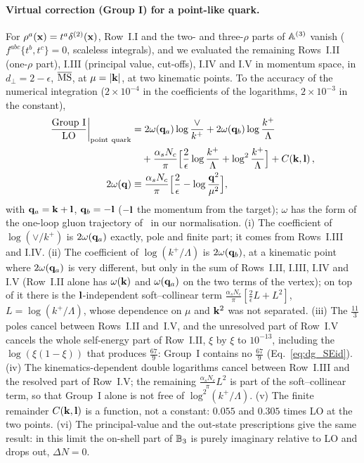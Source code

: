 \paragraph{Virtual correction (Group I) for a point-like quark.} For $\rho^a(\mathbf{x})=t^a\delta^{(2)}(\mathbf{x})$, Row~I.I and the two- and three-$\rho$ parts of $\mathbb{A}^{(3)}$ vanish ($f^{abc}\{t^b,t^c\}=0$, scaleless integrals), and we evaluated the remaining Rows~I.II (one-$\rho$ part), I.III (principal value, cut-offs), I.IV and I.V in momentum space, in $d_\perp=2-\epsilon$, $\overline{\rm MS}$, at $\mu=|\mathbf{k}|$, at two kinematic points. To the accuracy of the numerical integration ($2\times10^{-4}$ in the coefficients of the logarithms, $2\times10^{-3}$ in the constant),
\begin{align}\label{eq:dilute_groupI}
\frac{\text{Group I}}{\rm LO}\bigg|_{\rm point\ quark}&=2\omega(\mathbf{q}_a)\log\frac{\vee}{k^+}+2\omega(\mathbf{q}_b)\log\frac{k^+}{\Lambda}\notag\\&\quad+\frac{\alpha_sN_c}{\pi}\Big[\frac2\epsilon\log\frac{k^+}{\Lambda}+\log^2\frac{k^+}{\Lambda}\Big]+C(\mathbf{k},\mathbf{l})\,,\notag\\
2\omega(\mathbf{q})&\equiv\frac{\alpha_sN_c}{\pi}\Big[\frac2\epsilon-\log\frac{\mathbf{q}^2}{\mu^2}\Big],
\end{align}
with $\mathbf{q}_a=\mathbf{k}+\mathbf{l}$, $\mathbf{q}_b=-\mathbf{l}$ ($-\mathbf{l}$ the momentum from the target); $\omega$ has the form of the one-loop gluon trajectory of~\cite{Fadin:1998py} in our normalisation. (i) The coefficient of $\log(\vee/k^+)$ is $2\omega(\mathbf{q}_a)$ exactly, pole and finite part; it comes from Rows~I.III and I.IV. (ii) The coefficient of $\log(k^+/\Lambda)$ is $2\omega(\mathbf{q}_b)$, at a kinematic point where $2\omega(\mathbf{q}_a)$ is very different, but only in the sum of Rows~I.II, I.III, I.IV and I.V (Row~I.II alone has $\omega(\mathbf{k})$ and $\omega(\mathbf{q}_a)$ on the two terms of the vertex); on top of it there is the $\mathbf{l}$-independent soft--collinear term $\frac{\alpha_sN_c}{\pi}[\frac2\epsilon L+L^2]$, $L=\log(k^+/\Lambda)$, whose dependence on $\mu$ and $\mathbf{k}^2$ was not separated. (iii) The $\frac{11}{3}$ poles cancel between Rows~I.II and~I.V, and the unresolved part of Row~I.V cancels the whole self-energy part of Row~I.II, $\xi$ by $\xi$ to $10^{-13}$, including the $\log(\xi(1-\xi))$ that produces $\frac{67}{9}$: Group~I contains no $\frac{67}{9}$ (Eq.~\eqref{eq:dg_SEid}). (iv) The kinematics-dependent double logarithms cancel between Row~I.III and the resolved part of Row~I.V; the remaining $\frac{\alpha_sN_c}{\pi}L^2$ is part of the soft--collinear term, so that Group~I alone is not free of $\log^2(k^+/\Lambda)$. (v) The finite remainder $C(\mathbf{k},\mathbf{l})$ is a function, not a constant: $0.055$ and $0.305$ times LO at the two points. (vi) The principal-value and the out-state prescriptions give the same result: in this limit the on-shell part of $\mathbb{B}_3$ is purely imaginary relative to LO and drops out, $\Delta N=0$.

